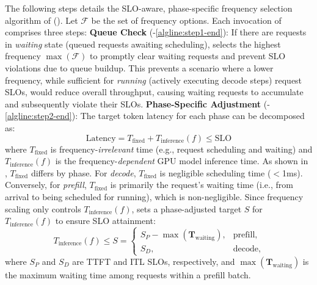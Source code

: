 The following steps details the SLO-aware, phase-specific frequency selection algorithm of \governor ().
Let $\mathcal{F}$ be the set of frequency options.
Each invocation of \governor comprises three steps:
 \textbf{Queue Check} (-\ref{algline:step1-end}):
If there are requests in \emph{waiting} state (queued requests awaiting scheduling), 
\governor selects the highest frequency $\max(\mathcal{F})$ to promptly clear waiting requests and prevent SLO violations due to queue buildup. 
This prevents a scenario where a lower frequency, while sufficient for \emph{running} (actively executing decode steps) request SLOs, would reduce overall throughput, causing waiting requests to accumulate and subsequently violate their SLOs.
 \textbf{Phase-Specific Adjustment} (-\ref{algline:step2-end}):
The target token latency for each phase can be decomposed as:
\begin{equation}
    \text{Latency} = T_{\text{fixed}} + T_{\text{inference}}(f) \le \text{SLO}
\end{equation}
where $T_{\text{fixed}}$ is frequency-\emph{irrelevant} time (e.g., request scheduling and waiting) and $T_{\text{inference}}(f)$ is the frequency-\emph{dependent} GPU model inference time.
As shown in , $T_{\text{fixed}}$ differs by phase.
For \emph{decode}, $T_{\text{fixed}}$ is negligible scheduling time ($<$1ms).
Conversely, for \emph{prefill}, $T_{\text{fixed}}$ is primarily the request's waiting time (i.e., from arrival to being scheduled for running), which is non-negligible.
Since frequency scaling only controls $T_{\text{inference}}(f)$, \governor sets a phase-adjusted target $S$ for $T_{\text{inference}}(f)$ to ensure SLO attainment:
\begin{equation}
    T_{\text{inference}}(f) \le S = \begin{cases}
        S_P - \max\left( \mathbf{T}_{\text{waiting}} \right), & \text{prefill,} \\
        S_D, & \text{decode,}
    \end{cases}
\end{equation}
where $S_P$ and $S_D$ are TTFT and ITL SLOs, respectively, and $\max\left( \mathbf{T}_{\text{waiting}} \right)$ is the maximum waiting time among requests within a prefill batch.

